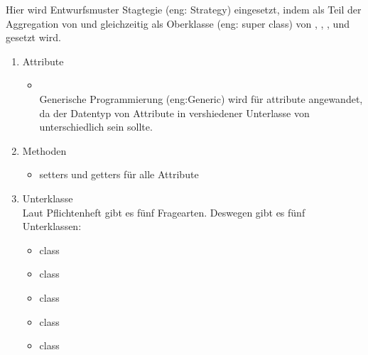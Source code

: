 \documentclass[a4paper]{scrreprt}
\begin{document}
{                    Hier wird Entwurfsmuster Stagtegie (eng: Strategy) eingesetzt, indem  als Teil der Aggregation von  und gleichzeitig als Oberklasse (eng: super class) von , , ,  und  gesetzt wird.
                    \begin{enumerate}
                        \item Attribute
                            \begin{itemize}
                                \item {\large {}}\\
                                    Generische Programmierung (eng:Generic) wird für attribute  angewandet, da der Datentyp von Attribute  in vershiedener Unterlasse von  unterschiedlich sein sollte.
                            \end{itemize}
                        \item Methoden
                            \begin{itemize}
                                \item {\large setters und getters für alle Attribute}
                            \end{itemize}
                        \item Unterklasse\\
                            Laut Pflichtenheft gibt es fünf Fragearten. Deswegen gibt es fünf Unterklassen:
                            \begin{itemize}
                                \item {\large class }
                                \item {\large class }
                                \item {\large class }
                                \item {\large class }
                                \item {\large class }
                            \end{itemize}
                    \end{enumerate}


}
\end{document}
